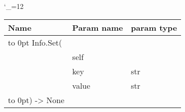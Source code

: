 \begingroup \catcode`\_=12 \tt
\begin{tabular}{lll}
\toprule
\textrm{Name}&\textrm{Param name}&\textrm{param type}\\
\midrule
\hbox to 0pt {Info.Set(\hss}\\
& self\\
& key & str\\
& value & str\\
\hbox to 0pt{) -> None\hss}\\
\bottomrule
\end{tabular}
\endgroup
